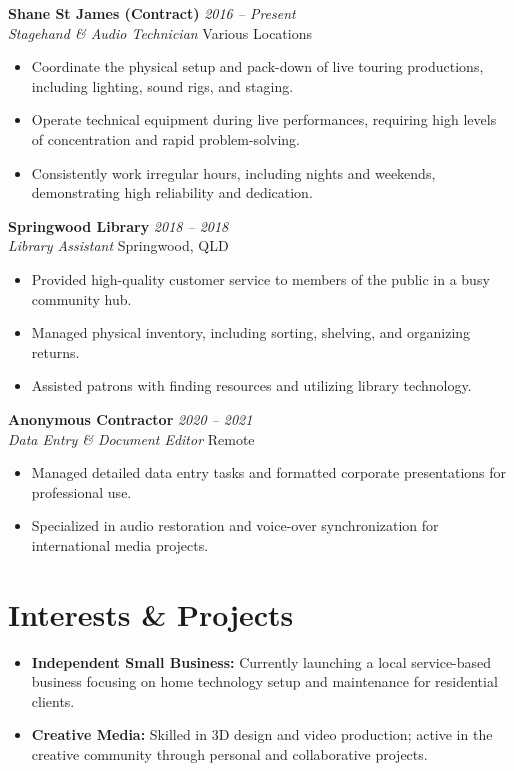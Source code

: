 \documentclass[11pt, a4paper]{article}
\begin{document}
\newpage

\textbf{Shane St James (Contract)} \hfill \textit{2016 – Present} \\
\textit{Stagehand \& Audio Technician} \hfill Various Locations
\begin{itemize}
    \item Coordinate the physical setup and pack-down of live touring productions, including lighting, sound rigs, and staging.
    \item Operate technical equipment during live performances, requiring high levels of concentration and rapid problem-solving.
    \item Consistently work irregular hours, including nights and weekends, demonstrating high reliability and dedication.
\end{itemize}

\vspace{10pt}

\textbf{Springwood Library} \hfill \textit{2018 – 2018} \\
\textit{Library Assistant} \hfill Springwood, QLD
\begin{itemize}
    \item Provided high-quality customer service to members of the public in a busy community hub.
    \item Managed physical inventory, including sorting, shelving, and organizing returns.
    \item Assisted patrons with finding resources and utilizing library technology.
\end{itemize}

\vspace{10pt}

\textbf{Anonymous Contractor} \hfill \textit{2020 – 2021} \\
\textit{Data Entry \& Document Editor} \hfill Remote
\begin{itemize}
    \item Managed detailed data entry tasks and formatted corporate presentations for professional use.
    \item Specialized in audio restoration and voice-over synchronization for international media projects.
\end{itemize}

\section{Interests \& Projects}
\begin{itemize}
    \item \textbf{Independent Small Business:} Currently launching a local service-based business focusing on home technology setup and maintenance for residential clients.
    \item \textbf{Creative Media:} Skilled in 3D design and video production; active in the creative community through personal and collaborative projects.
\end{itemize}
\end{document}
